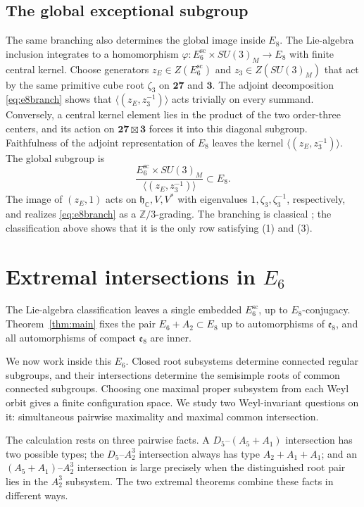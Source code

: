 \documentclass[11pt]{article}
\theoremstyle{remark}
\newcommand{\h}{\mathfrak h}
\newcommand{\e}{\mathfrak e}
\newcommand{\boxt}{\boxtimes}
\begin{document}
\subsection{The global exceptional subgroup}
The same branching also determines the global image inside \(E_8\). The
Lie-algebra inclusion integrates to a homomorphism
\(\varphi:E_6^{\mathrm{sc}}\times SU(3)_M\to E_8\) with finite central
kernel. Choose generators \(z_E\in Z(E_6^{\mathrm{sc}})\) and
\(z_3\in Z(SU(3)_M)\) that act by the same primitive cube root
\(\zeta_3\) on
\(\mathbf{27}\) and \(\mathbf3\). The adjoint decomposition
\eqref{eq:e8branch} shows that
\(\langle(z_E,z_3^{-1})\rangle\) acts trivially on every summand.
Conversely, a central kernel element lies in the product of the two
order-three centers, and its action on
\(\mathbf{27}\boxt\mathbf3\) forces it into this diagonal subgroup.
Faithfulness of the adjoint representation of \(E_8\) leaves the kernel
\(\langle(z_E,z_3^{-1})\rangle\). The global subgroup is
\[
 \frac{E_6^{\mathrm{sc}}\times SU(3)_M}
 {\langle(z_E,z_3^{-1})\rangle}\subset E_8.
\]
The image of \((z_E,1)\) acts on
\(\h_{\mathbb C},V,V^*\) with eigenvalues
\(1,\zeta_3,\zeta_3^{-1}\), respectively, and realizes
\eqref{eq:e8branch} as a \(\mathbb Z/3\)-grading. The branching is
classical \cite{Slansky,BarsGunaydin}; the classification above shows
that it is the only row satisfying (1) and (3).

\section{Extremal intersections in \texorpdfstring{\(E_6\)}{E6}}
\label{sec:incidence}

The Lie-algebra classification leaves a single embedded
\(E_6^{\mathrm{sc}}\), up to \(E_8\)-conjugacy. Theorem~\ref{thm:main} fixes the pair \(E_6+A_2\subset E_8\) up to automorphisms of \(\e_8\), and all automorphisms of compact \(\e_8\) are inner.

We now work inside this \(E_6\). Closed root subsystems determine connected
regular subgroups, and their intersections determine the semisimple roots of
common connected subgroups. Choosing one maximal proper subsystem from each
Weyl orbit gives a finite configuration space. We study two Weyl-invariant
questions on it: simultaneous pairwise maximality and maximal common
intersection.

The calculation rests on three pairwise facts. A \(D_5\)--\((A_5+A_1)\)
intersection has two possible types; the \(D_5\)--\(A_2^3\) intersection
always has type \(A_2+A_1+A_1\); and an \((A_5+A_1)\)--\(A_2^3\)
intersection is large precisely when
the distinguished root pair lies in the \(A_2^3\) subsystem. The two
extremal theorems combine these facts in different ways.
\end{document}
